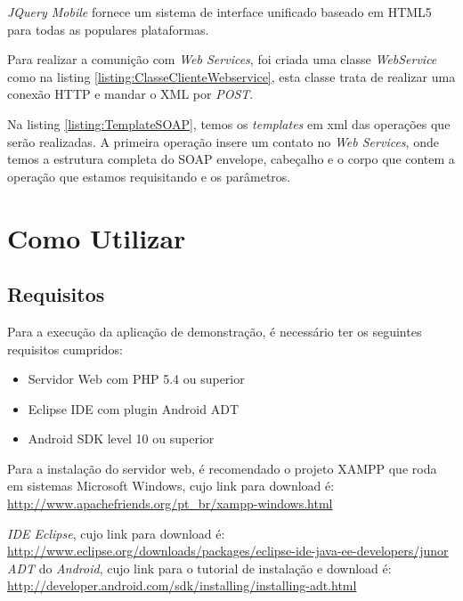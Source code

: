\documentclass{acm_proc_article-sp}
\begin{document}
	\emph{JQuery Mobile} fornece um sistema de interface unificado baseado em HTML5 para todas as populares plataformas.\cite{JQUERYMOBILESITE}
	
	Para realizar a comunição com \emph{Web Services}, foi criada uma classe \emph{WebService} como na listing \ref{listing:ClasseClienteWebservice}, esta classe trata de realizar uma conexão HTTP e mandar o XML por \emph{POST}.
	
	
	
	Na listing \ref{listing:TemplateSOAP}, temos os \emph{templates} em xml das operações que serão realizadas. A primeira operação insere um contato no \emph{Web Services}, onde temos a estrutura completa do SOAP envelope, cabeçalho e o corpo que contem a operação que estamos requisitando e os parâmetros.
	
	
 
\section{Como Utilizar}

	\subsection{Requisitos}
	
	Para a execução da aplicação de demonstração, é necessário ter os seguintes requisitos cumpridos:
	
		\begin{itemize}
			\item Servidor Web com PHP 5.4 ou superior
			\item Eclipse IDE com plugin Android ADT
			\item Android SDK level 10 ou superior
		\end{itemize}
	
	Para a instalação do servidor web, é recomendado o projeto XAMPP que roda em sistemas Microsoft Windows, cujo link para download é: \url{ http://www.apachefriends.org/pt_br/xampp-windows.html}
	
	\emph{IDE Eclipse}, cujo link para download é: \url{http://www.eclipse.org/downloads/packages/eclipse-ide-java-ee-developers/junor}
	\emph{ADT} do \emph{Android}, cujo link para o tutorial de instalação e download é: \url{http://developer.android.com/sdk/installing/installing-adt.html}
		
\end{document}

